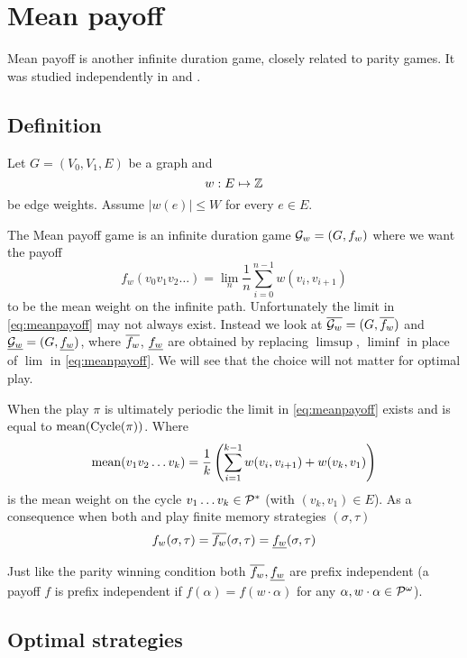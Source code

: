 \chapter{Mean payoff}
\label{chap:mean}

Mean payoff is another infinite duration game, closely related to parity games. It was studied independently in \cite{ehrenfeucht_positional_1979} and \cite{gurvich_cyclic_1988}.

\section{Definition}
Let $G=(V_0,V_1,E)$ be a graph and
\[
    w : E \mapsto \mathbb{Z}
\]
be edge weights. Assume $|w(e)| \leq W$ for every $e \in E$.

The Mean payoff game is an infinite duration game $\mathcal{G}_w=(G,f_w)$ where we want the payoff
\begin{equation}
    f_w (v_0v_1v_2 \ldots) = \lim_n \frac{1}{n} \sum_{i=0}^{n-1} w(v_i,v_{i+1}) \label{eq:meanpayoff}
\end{equation}
to be the mean weight on the infinite path. Unfortunately the limit in \eqref{eq:meanpayoff} may not always exist.
Instead we look at $\overline{\mathcal{G}_w}=(G,\overline{f_w})$ and $\underline{\mathcal{G}_w}=(G,\underline{f_w})$, where $\overline{f_w}$, $\underline{f_w}$ are obtained by replacing $\limsup$, $\liminf$ in place of $\lim$ in \eqref{eq:meanpayoff}. We will see that the choice will not matter for optimal play.

When the play $\pi$ is ultimately periodic the limit in \eqref{eq:meanpayoff} exists and is equal to $\operatorname*{mean}(\operatorname{Cycle}(\pi))$. Where
\begin{equation}
    \operatorname*{mean}(v_1 v_2 \ldots v_k) = \frac{1}{k} \left( \sum_{i=1}^{k-1} w(v_i, v_{i+1}) + w(v_k, v_1) \right) \label{eq:mean}
\end{equation}
is the mean weight on the cycle $v_1 \ldots v_k \in \mathcal{P}^{*}$ (with $(v_k,v_1) \in E$).
As a consequence when both  and  play finite memory strategies $(\sigma,\tau)$
\[
    f_w(\sigma,\tau) = \overline{f_w}(\sigma,\tau) = \underline{f_w}(\sigma,\tau)
\]

Just like the parity winning condition both $\overline{f_w},\underline{f_w}$ are prefix independent (a payoff $f$ is prefix independent if $f(\alpha) = f(w \cdot \alpha)$ for any $\alpha, w \cdot \alpha \in \mathcal{P}^\omega$).

\section{Optimal strategies}

